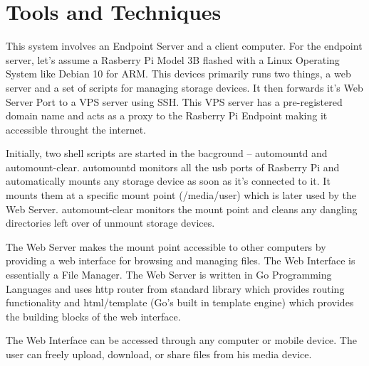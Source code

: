 \documentclass[12pt]{article}
\begin{document}
\section{Tools and Techniques}
\vspace{2cm}
\quad\quad
This system involves an Endpoint Server and a client computer. For the endpoint server, let's assume a Rasberry Pi Model 3B flashed with a Linux Operating System like Debian 10 for ARM. This devices primarily runs two things, a web server and a set of scripts for managing storage devices. It then forwards it's Web Server Port to a VPS server using SSH. This VPS server has a pre-registered domain name and acts as a proxy to the Rasberry Pi Endpoint making it accessible throught the internet. \\
\par
Initially, two shell scripts are started in the bacground -- automountd and automount-clear. automountd monitors all the usb ports of Rasberry Pi and automatically mounts any storage device as soon as it's connected to it. It mounts them at a specific mount point (/media/user) which is later used by the Web Server. automount-clear monitors the mount point and cleans any dangling directories left over of unmount storage devices. \\
\par
The Web Server makes the mount point accessible to other computers by providing a web interface for browsing and managing files. The Web Interface is essentially a File Manager. The Web Server is written in Go Programming Languages and uses http router from standard library which provides routing functionality and html/template (Go's built in template engine) which provides the building blocks of the web interface.\\
\par
The Web Interface can be accessed through any computer or mobile device. The user can freely upload, download, or share files from his media device.
\end{document}
